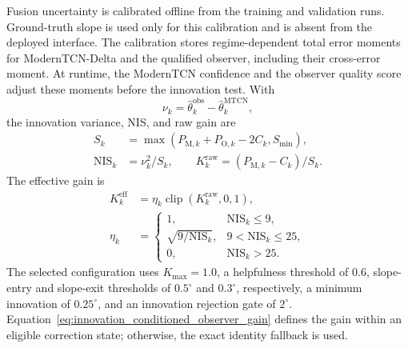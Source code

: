 \documentclass{ieeeaccess}
\begin{document}
Fusion uncertainty is calibrated offline from the training and validation
runs. Ground-truth slope is used only for this calibration and is absent from
the deployed interface. The calibration stores regime-dependent total error
moments for ModernTCN-Delta and the qualified observer, including their
cross-error moment. At runtime, the ModernTCN confidence and the observer
quality score adjust these moments before the innovation test. With
\[
\nu_k=\hat\theta_k^{\mathrm{obs}}-\hat\theta_k^{\mathrm{MTCN}},
\]
the innovation variance, NIS, and raw gain are
\begin{equation}
\begin{aligned}
S_k&=\max(P_{\mathrm{M},k}+P_{\mathrm{O},k}-2C_k,S_{\min}),\\
\mathrm{NIS}_k&=\nu_k^2/S_k,\qquad
K_k^{\mathrm{raw}}=(P_{\mathrm{M},k}-C_k)/S_k .
\end{aligned}
\label{eq:adaptive_observer_gain}
\end{equation}
The effective gain is
\begin{equation}
\begin{aligned}
K_k^{\mathrm{eff}}
&=\eta_k\operatorname{clip}(K_k^{\mathrm{raw}},0,1),\\
\eta_k
&=\begin{cases}
1, & \mathrm{NIS}_k\leq 9,\\
\sqrt{9/\mathrm{NIS}_k}, & 9<\mathrm{NIS}_k\leq 25,\\
0, & \mathrm{NIS}_k>25.
\end{cases}
\end{aligned}
\label{eq:innovation_conditioned_observer_gain}
\end{equation}
The selected configuration uses $K_{\max}=1.0$, a helpfulness threshold of
0.6, slope-entry and slope-exit thresholds of $0.5^{\circ}$ and
$0.3^{\circ}$, respectively, a minimum innovation of $0.25^{\circ}$, and an
innovation rejection gate of $2^{\circ}$. Equation~\eqref{eq:innovation_conditioned_observer_gain}
defines the gain within an eligible correction state; otherwise, the exact
identity fallback is used.
\end{document}
